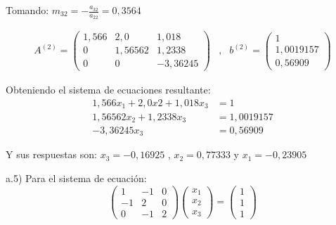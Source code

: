 Tomando: $m_{32}=-\frac{a_{32}}{a_{22}}=0,3564$

\begin{equation*}
    \begin{matrix}
        A^{(2)}= \begin{pmatrix}
            1,566 & 2,0 & 1,018 \\
            0 & 1,56562 & 1,2338 \\
            0 & 0 & -3,36245
        \end{pmatrix}
        & , &
        b^{(2)}=\begin{pmatrix}
            1 \\
            1,0019157 \\
            0,56909
        \end{pmatrix}
    \end{matrix}
\end{equation*}

Obteniendo el sistema de ecuaciones resultante:
\begin{align*}
    1,566x_1+2,0x2+1,018x_3 &=1 \\
    1,56562x_2+1,2338x_3 &=1,0019157 \\
    -3,36245x_3 &=0,56909
\end{align*}

Y sus respuestas son: $x_3=-0,16925 $ , $x_2=0,77333 $ y $x_1=-0,23905 $

a.5) Para el sistema de ecuación:\\
\begin{equation*}
    \begin{pmatrix}
        1 & -1 & 0 \\
        -1 & 2 & 0 \\
        0 & -1 & 2
    \end{pmatrix}
    \begin{pmatrix}
        x_1 \\
        x_2 \\
        x_3
    \end{pmatrix}    
    =    
    \begin{pmatrix}
        1 \\
        1 \\
        1
    \end{pmatrix}
\end{equation*}

